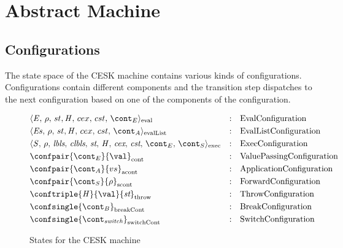 \documentclass[a4paper,oneside]{article}
\begin{document}
\section{Abstract Machine}
\subsection{Configurations}
\label{subsec:cesk-configs}

The state space of the CESK machine contains various kinds of configurations.
Configurations contain different components and the transition step dispatches to the next configuration based on one of the components of the configuration.

\newcommand{\breakconf}[1]{\confsingle{#1}_{\mathrm{breakCont}}}
\newcommand{\switchconf}[1]{\confsingle{#1}_{\mathrm{switchCont}}}
\newcommand{\contconf}[2]{\confpair{#1}{#2}_{\mathrm{cont}}}
\newcommand{\scontconf}[2]{\confpair{#1}{#2}_{\mathrm{scont}}}
\newcommand{\acontconf}[2]{\confpair{#1}{#2}_{\mathrm{acont}}}
\newcommand{\throwconf}[3]{\conftriple{#1}{#2}{#3}_{\mathrm{throw}}}
\newcommand{\evallistconf}[6]{\langle{#1},\,{#2},\,{#3},\handler,\,{#4},\,{#5},\,{#6}\rangle_{\mathrm{evalList}}}
\newcommand{\evalconf}[6]{\langle{#1},\,{#2},\,{#3},\handler,\,{#4},\,{#5},\,{#6}\rangle_{\mathrm{eval}}}
\newcommand{\execconf}[9]{\langle{#1},\,{#2},\,{#3},\,{#4},\,{#5},\,{#6},\,{#7},\,{#8},\,{#9}\rangle_{\mathrm{exec}}}

\begin{figure}[Htp]
  \begin{eqfigure}
  \begin{align}
    &\evalconf{\expr}{\env}{st}{cex}{cst}{\econt} & :\quad & \text{EvalConfiguration} \label{config:eval}\\
    &\evallistconf{\exprs}{\env}{st}{cex}{cst}{\acont} & :\quad & \text{EvalListConfiguration} \label{config:evallist}\\
    &\execconf{\stmt}{\env}{\lbls}{\clbls}{\strace}{\handler}{\cex,\,\cstrace}{\econt}{\scont}  & :\quad & \text{ExecConfiguration} \label{config:exec}\\
    &\contconf{\econt}{\val} & :\quad & \text{ValuePassingConfiguration} \label{config:econt}\\
    &\acontconf{\acont}{\vals} & :\quad & \text{ApplicationConfiguration} \label{config:acont}\\
    &\scontconf{\scont}{\env} & :\quad & \text{ForwardConfiguration} \label{config:scont}\\
    &\throwconf{\handler}{\val}{\strace} & :\quad & \text{ThrowConfiguration} \label{config:throw}\\
    &\breakconf{\bcont} & :\quad & \text{BreakConfiguration} \label{config:bcont}\\
    &\switchconf{\switchcont} & :\quad &
    \text{SwitchConfiguration}
    \label{config:switchcont}
  \end{align}
  \caption{States for the CESK machine}
  \end{eqfigure}
\end{figure}
\end{document}
